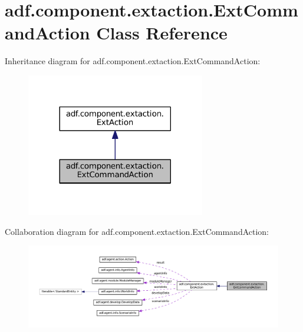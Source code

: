 \hypertarget{classadf_1_1component_1_1extaction_1_1ExtCommandAction}{}\section{adf.\+component.\+extaction.\+Ext\+Command\+Action Class Reference}
\label{classadf_1_1component_1_1extaction_1_1ExtCommandAction}


Inheritance diagram for adf.\+component.\+extaction.\+Ext\+Command\+Action\+:
\nopagebreak
\begin{figure}[H]
\begin{center}
\leavevmode
\includegraphics[width=221pt]{classadf_1_1component_1_1extaction_1_1ExtCommandAction__inherit__graph}
\end{center}
\end{figure}


Collaboration diagram for adf.\+component.\+extaction.\+Ext\+Command\+Action\+:
\nopagebreak
\begin{figure}[H]
\begin{center}
\leavevmode
\includegraphics[width=350pt]{classadf_1_1component_1_1extaction_1_1ExtCommandAction__coll__graph}
\end{center}
\end{figure}
